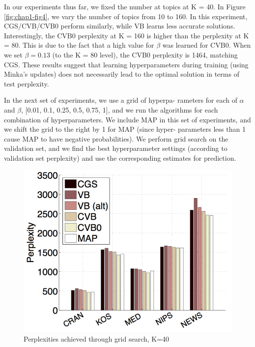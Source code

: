 In our experiments thus far, we fixed the number at topics at K = 40. In Figure \ref{fig:chap1-fig4}, we vary the number of topics from 10 to 160. In this experiment, CGS/CVB/CVB0 perform similarly, while VB learns less accurate solutions. Interestingly, the CVB0 perplexity at K = 160 is higher than the perplexity at K = 80. This is due to the fact that a high value for $\beta$ was learned for CVB0. When we set $\beta = 0.13$ (to the K = 80 level), the CVB0 perplexity is 1464, matching CGS. These results suggest that learning hyperparameters during training (using Minka’s updates) does not necessarily lead to the optimal solution in terms of test perplexity.

In the next set of experiments, we use a grid of hyperpa- rameters for each of $\alpha$ and $\beta$, [0.01, 0.1, 0.25, 0.5, 0.75, 1], and we run the algorithms for each combination of hyperparameters. We include MAP in this set of experiments, and we shift the grid to the right by 1 for MAP (since hyper- parameters less than 1 cause MAP to have negative probabilities). We perform grid search on the validation set, and we find the best hyperparameter settings (according to validation set perplexity) and use the corresponding estimates for prediction.


\begin{figure}
  \centering
    \hspace*{-1.5cm}\includegraphics[height=0.35\textheight]{./Chap1/plots/figs/fig5.png}
  \caption{Perplexities achieved through grid search, K=40}
  \label{fig:chap1-fig5}
\end{figure}


